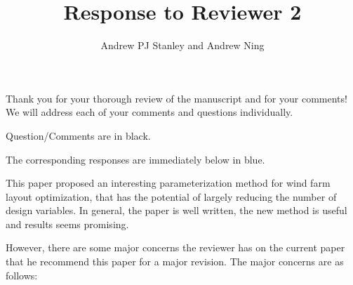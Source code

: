 \documentclass[12pt]{report}
\title{Response to Reviewer 2}
\begin{document}






\author{Andrew PJ Stanley and Andrew Ning}

\maketitle

Thank you for your thorough review of the manuscript and for your comments! We will address each of your comments and questions individually.

\bigskip
Question/Comments are in black.

\color{blue} The corresponding responses are immediately below in blue.

\bigskip \color{black}

This paper proposed an interesting parameterization method for wind farm layout optimization, that has the potential of largely reducing the number of design variables. In general, the paper is well written, the new method is useful and results seems promising. 

However, there are some major concerns the reviewer has on the current paper that he recommend this paper for a major revision. The major concerns are as follows: 
\end{document}
